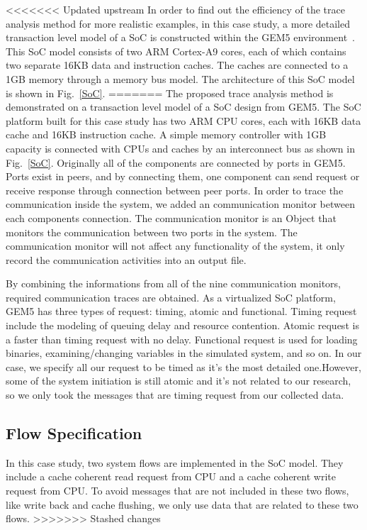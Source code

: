 \documentclass[conference]{IEEEtran}
\begin{document}
<<<<<<< Updated upstream
In order to find out the efficiency of the trace analysis method for more realistic examples, in this case study, a more detailed transaction level model of a SoC is constructed within the GEM5 environment~\cite{Binkert2011}.  This SoC model consists of two ARM Cortex-A9 cores, each of which contains two separate 16KB data and instruction caches.  The caches are connected to a 1GB memory through a memory bus model.  The architecture of this SoC model is shown in Fig.~\ref{SoC}.  
=======
The proposed trace analysis method is demonstrated on a transaction level model of a SoC design from GEM5. The SoC platform built for this case study has two ARM CPU cores, each with 16KB data cache and 16KB instruction cache. A simple memory controller with 1GB capacity is connected with CPUs and caches by an interconnect bus as shown in Fig.~\ref{SoC}.  Originally all of the components are connected by ports in GEM5. Ports exist in peers, and by connecting them, one component can send request or receive response through connection between peer ports. In order to trace the communication inside the system, we added an communication monitor between each components connection. The communication monitor is an Object that monitors the communication  between two ports in the system. The communication monitor will not affect any functionality of the system, it only record the communication activities into an output file.

By combining the informations from all of the nine communication monitors, required communication traces are obtained. As a virtualized SoC platform, GEM5 has three types of request: timing, atomic and functional. Timing request include the modeling of queuing delay and resource contention. Atomic request is a faster than timing request with no delay.  Functional request is used for loading binaries, examining/changing variables in the simulated system, and so on. In our case, we specify all our request to be timed as it's the most detailed one.However, some of the system initiation is still atomic and it's not related to our research, so we only took the messages that are timing request from our collected data. 

\subsection{Flow Specification}

In this case study, two system flows are implemented in the SoC model. They include a cache coherent read request from CPU and a cache coherent write request from CPU.  To avoid messages that are not included in these two flows, like write back and cache flushing, we only use data that are related to these two flows.
>>>>>>> Stashed changes
\end{document}
